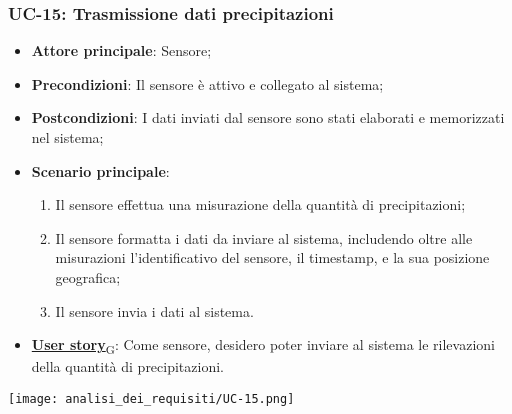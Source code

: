 \subsubsection{UC-15: Trasmissione dati precipitazioni}
\begin{itemize}
	\item \textbf{Attore principale}: Sensore;
	\item \textbf{Precondizioni}: Il sensore è attivo e collegato al sistema;
	\item \textbf{Postcondizioni}: I dati inviati dal sensore sono stati elaborati e memorizzati nel sistema;
	\item \textbf{Scenario principale}:
	      \begin{enumerate}
		      \item Il sensore effettua una misurazione della quantità di precipitazioni;
		      \item Il sensore formatta i dati da inviare al sistema, includendo oltre alle misurazioni l'identificativo del sensore,
		            il timestamp, e la sua posizione geografica;
		      \item Il sensore invia i dati al sistema.
	      \end{enumerate}
	\item \href{https://7last.github.io/docs/rtb/documentazione-interna/glossario\#user-story}{\textbf{User story}\textsubscript{G}}: Come sensore, desidero poter inviare al sistema le rilevazioni della quantità di precipitazioni.
\end{itemize}

\begin{center}
	\texttt{[image: analisi\_dei\_requisiti/UC-15.png]}
\end{center}

